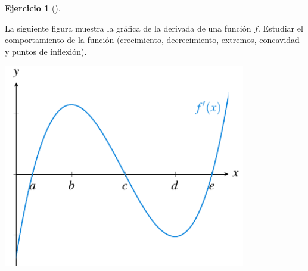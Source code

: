\documentclass[
  a4paper,
]{scrreport}
\theoremstyle{definition}
\newtheorem{exercise}{Ejercicio}[chapter]
\theoremstyle{remark}
\begin{document}
\begin{exercise}[]\protect\hypertarget{exr-extremos-1}{}\label{exr-extremos-1}

La siguiente figura muestra la gráfica de la derivada de una función
\(f\). Estudiar el comportamiento de la función (crecimiento,
decrecimiento, extremos, concavidad y puntos de inflexión).

\includegraphics[width=4.16667in,height=\textheight,keepaspectratio]{./img/derivadas/grafica-ext-1.pdf}

\end{exercise}
\end{document}
